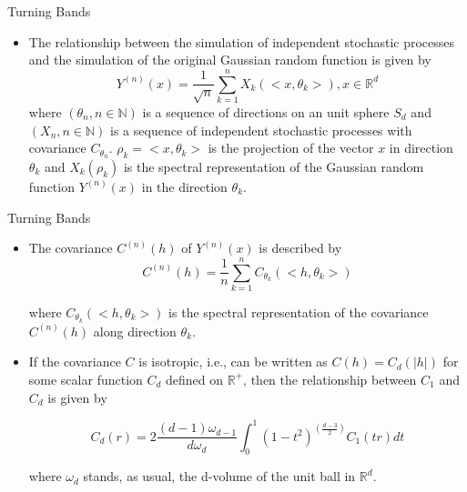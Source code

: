 \begin{frame}{Turning Bands}
\begin{itemize}
 \item The relationship between the simulation of independent stochastic processes and the simulation of the original Gaussian random function is given by 
 \begin{equation}
  Y^{(n)}(x) = \frac{1}{\sqrt{n}} \sum_{k=1}^{n} X_k(<x,\theta_k>), x \in \mathbb{R}^d
 \end{equation}
 where $(\theta_n, n \in \mathbb{N})$ is a sequence of directions on an unit sphere $S_d$ and $(X_n, n \in \mathbb{N})$ is a sequence of
 independent stochastic processes with covariance $C_{\theta_n}$. $\rho_k = <x, \theta_k>$ is the projection of the vector
 $x$ in direction $\theta_k$ and $X_k(\rho_k)$ is the spectral representation of the Gaussian random function $Y^{(n)}(x)$ in
 the direction $\theta_k$.
\end{itemize}
\end{frame}

\begin{frame}{Turning Bands}
\begin{itemize}
\item The covariance $C^{(n)}(h)$ of $Y^{(n)}(x)$ is described by
\begin{equation}
C^{(n)}(h) = \frac{1}{n} \sum_{k=1}^{n} C_{\theta_k}(<h, \theta_k>)
\end{equation}

where $C_{\theta_k}(<h, \theta_k>)$ is the spectral representation of the covariance $C^{(n)}(h)$ along direction $\theta_k$.

\item If the covariance $C$ is isotropic, i.e., can be written as $C(h)=C_d(|h|)$ for some scalar function $C_d$ defined on 
$\mathbb{R}^{+}$, then the relationship between $C_1$ and $C_d$ is given by

\begin{equation}\label{eq_cov_d}
 C_d(r) = 2 \frac{(d-1)\omega_{d-1}}{d\omega_{d}} \int_{0}^{1}(1-t^2)^(\frac{d-3}{2})C_1(tr) dt
\end{equation}

where $\omega_{d}$ stands, as usual, the d-volume of the unit ball in $\mathbb{R}^d$. 
\end{itemize}
\end{frame}


